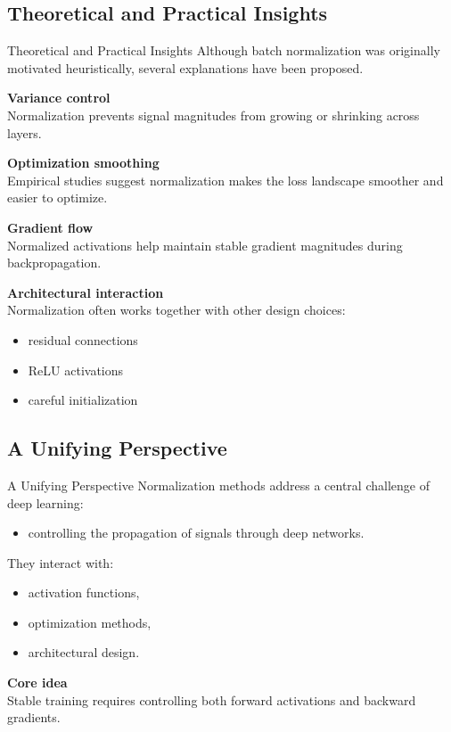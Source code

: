 \documentclass[aspectratio=169,11pt]{beamer}
\begin{document}
\subsection{Theoretical and Practical Insights}
\begin{frame}[t,allowframebreaks]{Theoretical and Practical Insights}
\small
Although batch normalization was originally motivated heuristically, several explanations have been proposed.

\textbf{Variance control}\\ Normalization prevents signal magnitudes from growing or shrinking across layers.

\textbf{Optimization smoothing}\\ Empirical studies suggest normalization makes the loss landscape smoother and easier to optimize.

\textbf{Gradient flow}\\ Normalized activations help maintain stable gradient magnitudes during backpropagation.

\textbf{Architectural interaction}\\ Normalization often works together with other design choices:

\begin{itemize}
\item residual connections
\item ReLU activations
\item careful initialization
\end{itemize}
\end{frame}

\subsection{A Unifying Perspective}
\begin{frame}[t,allowframebreaks]{A Unifying Perspective}
\small
Normalization methods address a central challenge of deep learning:

\begin{itemize}
\item controlling the propagation of signals through deep networks.
\end{itemize}

They interact with:

\begin{itemize}
\item activation functions,
\item optimization methods,
\item architectural design.
\end{itemize}

\textbf{Core idea}\\ Stable training requires controlling both forward activations and backward gradients.
\end{frame}
\end{document}
